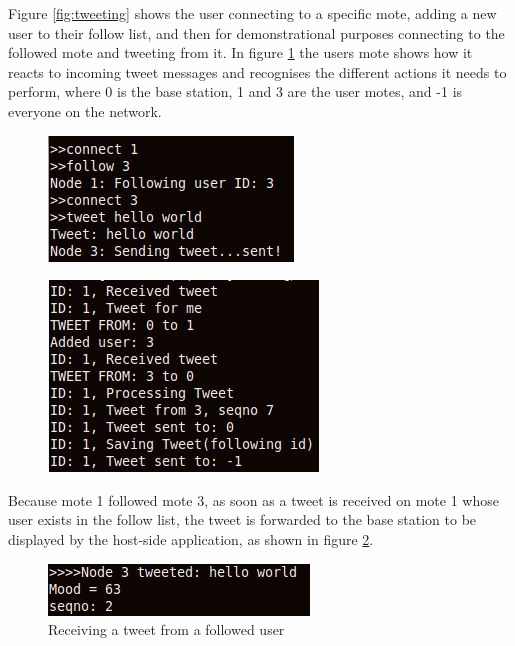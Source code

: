 \documentclass{article}
\begin{document}
Figure \ref{fig:tweeting} shows the user connecting to a specific mote, adding a new user to their follow list, and then for demonstrational purposes connecting to the followed mote and tweeting from it. In figure \ref{fig:motetweeting} the users mote shows how it reacts to incoming tweet messages and recognises the different actions it needs to perform, where 0 is the base station, 1 and 3 are the user motes, and -1 is everyone on the network.
\begin{figure}[htb!]

\begin{minipage}{.5\textwidth}
\begin{center}
    \includegraphics[scale=.6]{img/tweet.jpg}
    \centering
	\label{fig:tweeting}
	\end{center}
    \end{minipage}%
    \begin{minipage}{.5\textwidth}
    \begin{center}
    \includegraphics[scale=.5]{img/motetweet.jpg}
    \label{fig:motetweeting}
\end{center}

\end{minipage}

\end{figure}

Because mote 1 followed mote 3, as soon as a tweet is received on mote 1 whose user exists in the follow list, the tweet is forwarded to the base station to be displayed by the host-side application, as shown in figure \ref{fig:receive}.
\begin{figure}[htb!]
\centering
\includegraphics[scale=.7]{img/receive.jpg}
\caption{Receiving a tweet from a followed user}
\label{fig:receive}
\end{figure}
\end{document}
